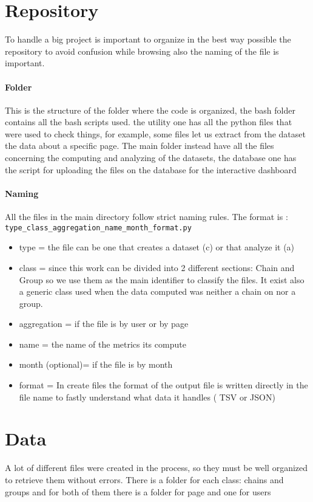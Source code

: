 \section{Repository}
To handle a big project is important to organize in the best way possible the repository to avoid
confusion while browsing also the naming of the file is important.
\paragraph{Folder}
This is the structure of the folder where the code is organized, the bash folder contains all the bash
scripts used. the utility one has all the python files that were used to check things, for example,
some files let us extract from the dataset the data about a specific page. The main
folder instead have all the files concerning the computing and analyzing of the datasets, the
database one has the script for uploading the files on the database for the interactive dashboard

\paragraph{Naming}
All the files in the main directory follow strict naming rules. The format is : \\
\texttt{type\_class\_aggregation\_name\_month\_format.py}
\begin{itemize}
    \item type = the file can be one that creates a dataset (c) or that analyze it (a)
    \item class = since this work can be divided into 2 different sections: Chain and Group so we use
    them as the main identifier to classify the files. It exist also a generic class used when the data
    computed was neither a chain on nor a group.
    \item aggregation = if the file is by user or by page 
    \item name = the name of the metrics its compute
    \item month (optional)= if the file is by month 
    \item format = In create files the format of the output file is written directly in the file
    name to fastly understand what data it handles ( TSV or JSON)
\end{itemize}

\section{Data}
A lot of different files were created in the process, so they must be well organized to retrieve them
without errors. There is a folder for each class: chains and groups and for both of them there is
a folder for page and one for users

